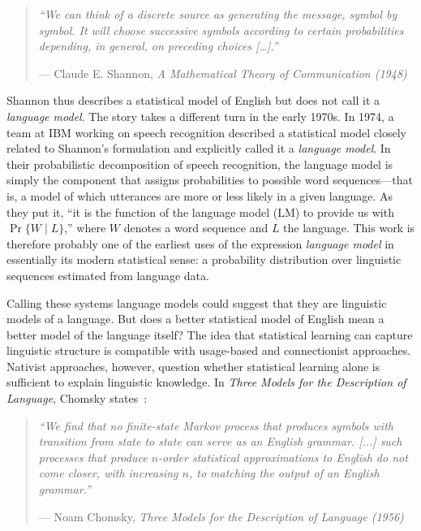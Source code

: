 \begin{quote}
    \small\itshape
    ``We can think of a discrete source as generating the message, symbol by symbol.
    It will choose successive symbols according to certain probabilities depending,
    in general, on preceding choices [\ldots{}].''

    \begin{flushright}
    \normalfont--- Claude E. Shannon, \textit{A Mathematical Theory of Communication (1948)}
    \end{flushright}
\end{quote}
Shannon thus describes a statistical
model of English but does not call it a \textit{language model}.
The story takes a different turn in the early 1970s. In 1974, a team at IBM working 
on speech recognition described a statistical model closely related to Shannon's formulation and explicitly 
called it a \textit{language model}. In their probabilistic decomposition of speech recognition, 
the language model is simply the component that assigns probabilities to possible 
word sequences---that is, a model of which utterances are more or less likely in a given language. 
As they put it, ``it is the function of the language model (LM) to provide us with $\Pr\{W \mid L\}$,'' 
where $W$ denotes a word sequence and $L$ the language. 
This work is therefore probably one of the earliest uses of the expression \textit{language model} 
in essentially its modern statistical sense: a probability distribution over linguistic sequences 
estimated from language data.

Calling these systems language models could suggest that they are
linguistic models of a language. But does a better statistical model of English mean a better model of the language itself?
The idea that statistical learning can capture linguistic structure is compatible 
with usage-based and connectionist approaches. Nativist approaches, 
however, question whether statistical learning alone is sufficient to explain linguistic knowledge.
In \textit{Three Models for the Description of Language}, Chomsky states~\citep[p.~113]{chomsky1956three}:


\begin{quote}
    \small\itshape
    ``We find that no finite-state Markov process that produces symbols with transition from state to state can serve as an English grammar. 
    [...] such processes that produce $n$-order statistical approximations to English do not come closer, with increasing $n$, to matching the output of an English grammar.''

    \begin{flushright}
    \normalfont--- Noam Chomsky, \textit{Three Models for the Description of Language (1956)}
    \end{flushright}
\end{quote}

